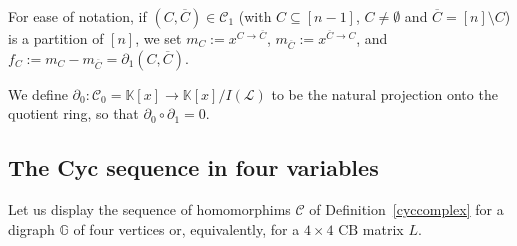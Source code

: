 \documentclass[ALCO]{cedram}
\newcommand{\mbk}{\mbox{$\mathbb{K}$}}
\newcommand{\mbg}{\mbox{$\mathbb{G}$}}
\newcommand{\mcc}{\mbox{$\mathcal{C}$}}
\newcommand{\mcl}{\mbox{$\mathcal{L}$}}
\newcommand{\cb}{\mbox{$\mathrm{CB}$}}
\newcommand{\dif}{\mbox{$\partial$}}
\begin{document}
\begin{notation}\label{fC}
For ease of notation, if $(C,\overline{C})\in \mcc_1$ (with
$C\subseteq [n-1]$, $C\neq\emptyset$ and $\overline{C}=[n]\setminus
C$) is a partition of $[n]$, we set $m_C:=x^{C\to\overline{C}}$,
$m_{\overline C}:=x^{\overline{C}\to C}$, and
$f_C:=m_C-m_{\overline{C}}=\dif_1(C,\overline{C})$.
\end{notation}

\begin{definition}\label{dif0}
 We define $\dif_0:\mcc_0=\mbk[x]\to \mbk[x]/I(\mcl)$ to be the
 natural projection onto the quotient ring, so that $\dif_0\circ
 \dif_1=0$.
\end{definition}

\subsection{The Cyc sequence in four variables}

 Let us display the sequence of homomorphims $\mcc$ of
Definition~\ref{cyccomplex} for a digraph $\mbg$ of four vertices or,
equivalently, for a $4\times 4$ $\cb$ matrix $L$.
\end{document}
